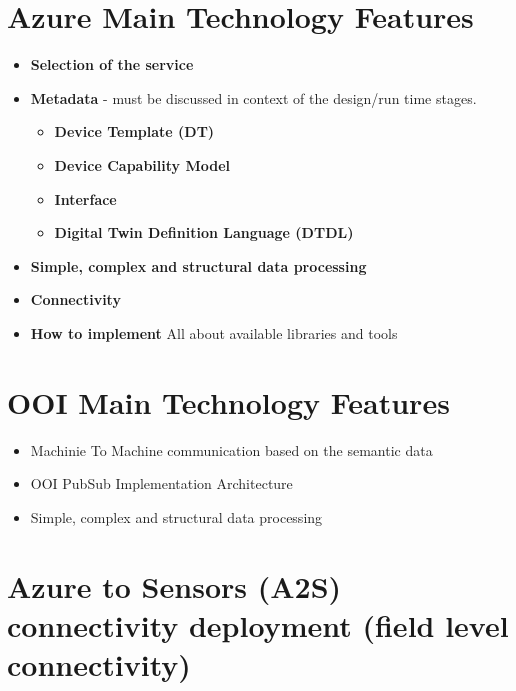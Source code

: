 \documentclass{article}
\providecommand{\tightlist} { \setlength{\itemsep}{0pt}\setlength{\parskip}{0pt}}
\begin{document}
\hypertarget{azure-main-technology-features}{%
  \section{Azure Main Technology
    Features}\label{azure-main-technology-features}}

\begin{itemize}
  \tightlist
  \item
        \textbf{Selection of the service}
  \item
        \textbf{Metadata} - must be discussed in context of the design/run
        time stages.

        \begin{itemize}
          \tightlist
          \item
                \textbf{Device Template (DT)}
          \item
                \textbf{Device Capability Model}
          \item
                \textbf{Interface}
          \item
                \textbf{Digital Twin Definition Language (DTDL)}
        \end{itemize}
  \item
        \textbf{Simple, complex and structural data processing}
  \item
        \textbf{Connectivity}
  \item
        \textbf{How to implement} All about available libraries and tools
\end{itemize}

\hypertarget{ooi-main-technology-features}{%
  \section{OOI Main Technology
    Features}\label{ooi-main-technology-features}}

\begin{itemize}
  \tightlist
  \item
        Machinie To Machine communication based on the semantic data
  \item
        OOI PubSub Implementation Architecture
  \item
        Simple, complex and structural data processing
\end{itemize}

\hypertarget{azure-to-sensors-a2s-connectivity-deployment-field-level-connectivity}{%
  \section{Azure to Sensors (A2S) connectivity deployment (field level
    connectivity)}\label{azure-to-sensors-a2s-connectivity-deployment-field-level-connectivity}}
\end{document}
